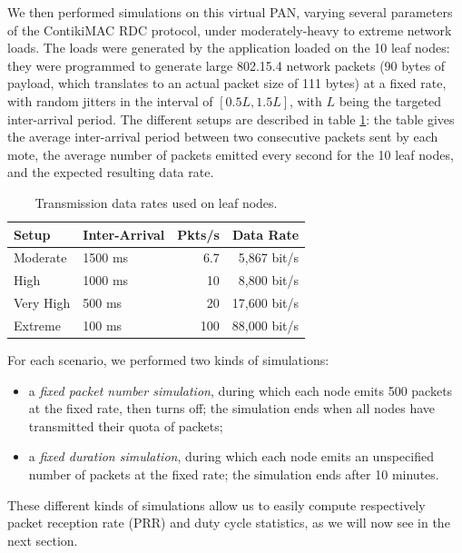 \documentclass[a4paper,twoside]{article}
\begin{document}
We then performed simulations on this virtual PAN, varying several parameters
of the ContikiMAC RDC protocol, under moderately-heavy to extreme network
loads. The loads were generated by the application loaded on the 10 leaf
nodes: they were programmed to generate large 802.15.4 network packets
(90 bytes of payload, which translates to an actual packet size of
111 bytes) at a fixed rate, with random jitters in the interval of
$[ 0.5 L , 1.5  L ]$, with $L$ being the targeted inter-arrival
period. The different setups are described in table \ref{TblDataRates}:
the table gives the average inter-arrival period between two consecutive
packets sent by each mote, the average number of packets emitted every
second for the 10 leaf nodes, and the expected resulting data rate.

\begin{table}[htb]
\centering
\begin{tabular}{|l|p{1.25cm}|r|r|}
\hline
Setup     &  Inter-Arrival  & Pkts/s & Data Rate \\
\hline
Moderate  & 1500 ms &   6.7  &  5,867 bit/s \\ 
High      & 1000 ms &  10    &  8,800 bit/s \\
Very High &  500 ms &  20    & 17,600 bit/s \\
Extreme   &  100 ms & 100    & 88,000 bit/s \\
\hline
\end{tabular}
\caption{Transmission data rates used on leaf nodes.}
\label{TblDataRates}
\end{table}

For each scenario, we performed two kinds of simulations:
\begin{itemize}
\item a \emph{fixed packet number simulation}, during which each node emits
500 packets at the fixed rate, then turns off; the simulation ends when all
nodes have transmitted their quota of packets;

\item a \emph{fixed duration simulation}, during which each node emits an
unspecified number of packets at the fixed rate; the simulation ends after
10 minutes.
\end{itemize}

These different kinds of simulations allow us to easily compute respectively
packet reception rate (PRR) and duty cycle statistics, as we will now see
in the next section.


\end{document}
